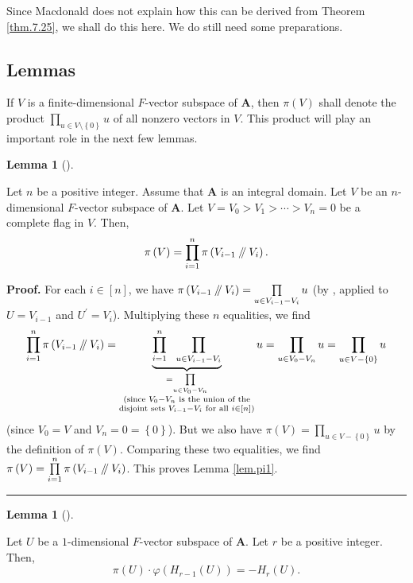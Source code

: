 \documentclass[numbers=enddot,12pt,final,onecolumn,notitlepage]{scrartcl}%
\numberwithin{exer}{section}
\theoremstyle{definition}
\newtheorem{lem}[theo]{Lemma}
\newenvironment{lemma}[1][]
{\begin{lem}[#1]\begin{leftbar}}
{\end{leftbar}\end{lem}}
\newenvironment{proof}[1][Proof]{\noindent\textbf{#1.} }{\ \rule{0.5em}{0.5em}}
\let\prodnonlimits\prod
\renewcommand{\prod}{\prodnonlimits\limits}
\newcommand{\sslash}{\mathbin{/\mkern-5mu/}}
\theoremstyle{plainsl}
\begin{document}
Since Macdonald does not explain how this can be derived from Theorem
\ref{thm.7.25}, we shall do this here. We do still need some preparations.

\subsection{Lemmas}

If $V$ is a finite-dimensional $F$-vector subspace of $\mathbf{A}$, then
$\pi\left(  V\right)  $ shall denote the product $\prod_{u\in V\setminus
\left\{  0\right\}  }u$ of all nonzero vectors in $V$. This product will play
an important role in the next few lemmas.

\begin{lemma}
\label{lem.pi1}Let $n$ be a positive integer. Assume that $\mathbf{A}$ is an
integral domain. Let $V$ be an $n$-dimensional $F$-vector subspace of
$\mathbf{A}$. Let $V=V_{0}>V_{1}>\cdots>V_{n}=0$ be a complete flag in $V$.
Then,%
\[
\pi\left(  V\right)  =\prod_{i=1}^{n}\pi\left(  V_{i-1}\sslash V_{i}\right)
.
\]

\end{lemma}

\begin{proof}
For each $i\in\left[  n\right]  $, we have $\pi\left(  V_{i-1}\sslash V_{i}%
\right)  =\prod_{u\in V_{i-1}-V_{i}}u$ (by \cite[(7.21)]{Macdon92}, applied to
$U=V_{i-1}$ and $U^{\prime}=V_{i}$). Multiplying these $n$ equalities, we find%
\[
\prod_{i=1}^{n}\pi\left(  V_{i-1}\sslash V_{i}\right)  =\underbrace{\prod
_{i=1}^{n}\ \ \prod_{u\in V_{i-1}-V_{i}}}_{\substack{=\prod_{u\in V_{0}-V_{n}%
}\\\text{(since }V_{0}-V_{n}\text{ is the union of the}\\\text{disjoint sets
}V_{i-1}-V_{i}\text{ for all }i\in\left[  n\right]  \text{)}}}u=\prod_{u\in
V_{0}-V_{n}}u=\prod_{u\in V-\left\{  0\right\}  }u
\]
(since $V_{0}=V$ and $V_{n}=0=\left\{  0\right\}  $). But we also have
$\pi\left(  V\right)  =\prod_{u\in V-\left\{  0\right\}  }u$ by the definition
of $\pi\left(  V\right)  $. Comparing these two equalities, we find
$\pi\left(  V\right)  =\prod_{i=1}^{n}\pi\left(  V_{i-1}\sslash V_{i}\right)
$. This proves Lemma \ref{lem.pi1}.
\end{proof}

\begin{lemma}
\label{lem.Hri1}Let $U$ be a $1$-dimensional $F$-vector subspace of
$\mathbf{A}$. Let $r$ be a positive integer. Then,%
\[
\pi\left(  U\right)  \cdot\varphi\left(  H_{r-1}\left(  U\right)  \right)
=-H_{r}\left(  U\right)  .
\]

\end{lemma}
\end{document}
